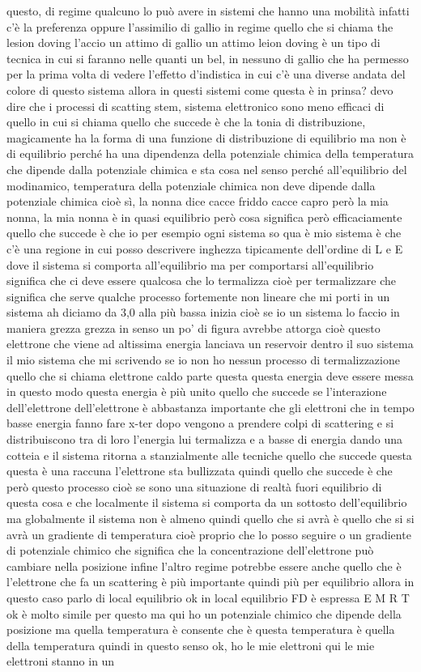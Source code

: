 questo, di regime qualcuno lo può avere in sistemi che hanno una mobilità infatti c'è la preferenza oppure l'assimilio di gallio in regime quello che si chiama the lesion doving l'accio un attimo di gallio un attimo leion doving è un tipo di tecnica in cui si faranno nelle quanti un bel, in nessuno di gallio che ha permesso per la prima volta di vedere l'effetto d'indistica in cui c'è una diverse andata del colore di questo sistema allora in questi sistemi come questa è in prinsa? devo dire che i processi di scatting stem, sistema elettronico sono meno efficaci di quello in cui si chiama quello che succede è che la tonia di distribuzione, magicamente ha la forma di una funzione di distribuzione di equilibrio ma non è di equilibrio perché ha una dipendenza della potenziale chimica della temperatura che dipende dalla potenziale chimica e sta cosa nel senso perché all'equilibrio del modinamico, temperatura della potenziale chimica non deve dipende dalla potenziale chimica cioè sì, la nonna dice cacce friddo cacce capro però la mia nonna, la mia nonna è in quasi equilibrio però cosa significa però efficaciamente quello che succede è che io per esempio ogni sistema so qua è mio sistema è che c'è una regione in cui posso descrivere inghezza tipicamente dell'ordine di L e E dove il sistema si comporta all'equilibrio ma per comportarsi all'equilibrio significa che ci deve essere qualcosa che lo termalizza cioè per termalizzare che significa che serve qualche processo fortemente non lineare che mi porti in un sistema ah diciamo da 3,0 alla più bassa inizia cioè se io un sistema lo faccio in maniera grezza grezza in senso un po' di figura avrebbe attorga cioè questo elettrone che viene ad altissima energia lanciava un reservoir dentro il suo sistema il mio sistema che mi scrivendo se io non ho nessun processo di termalizzazione quello che si chiama elettrone caldo parte questa questa energia deve essere messa in questo modo questa energia è più unito quello che succede se l'interazione dell'elettrone dell'elettrone è abbastanza importante che gli elettroni che in tempo basse energia fanno fare x-ter dopo vengono a prendere colpi di scattering e si distribuiscono tra di loro l'energia lui termalizza e a basse di energia dando una cotteia e il sistema ritorna a stanzialmente alle tecniche quello che succede questa questa è una raccuna l'elettrone sta bullizzata quindi quello che succede è che però questo processo cioè se sono una situazione di realtà fuori equilibrio di questa cosa e che localmente il sistema si comporta da un sottosto dell'equilibrio ma globalmente il sistema non è almeno quindi quello che si avrà è quello che si si avrà un gradiente di temperatura cioè proprio che lo posso seguire o un gradiente di potenziale chimico che significa che la concentrazione dell'elettrone può cambiare nella posizione infine l'altro regime potrebbe essere anche quello che è l'elettrone che fa un scattering è più importante quindi più per equilibrio allora in questo caso parlo di local equilibrio ok in local equilibrio FD è espressa E M R T ok è molto simile per questo ma qui ho un potenziale chimico che dipende della posizione ma quella temperatura è consente che è questa temperatura è quella della temperatura quindi in questo senso ok, ho le mie elettroni qui le mie elettroni stanno in un 